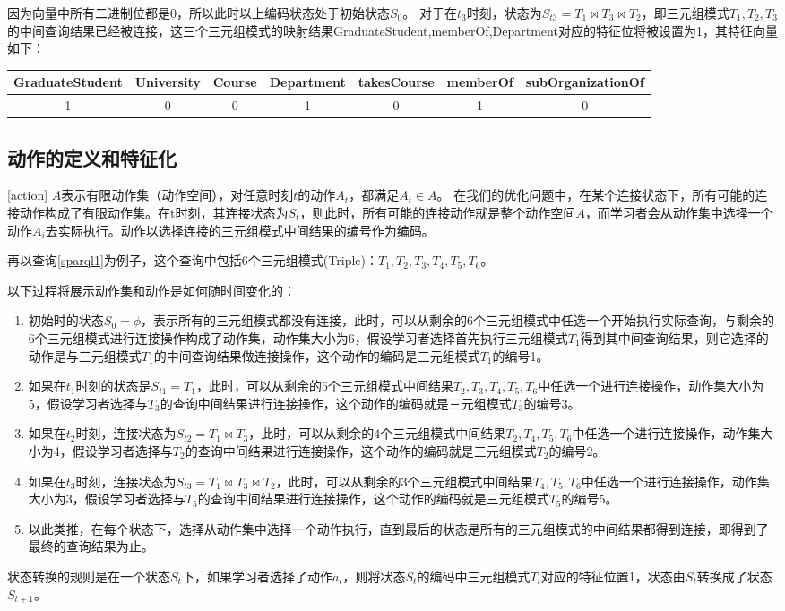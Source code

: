 因为向量中所有二进制位都是0，所以此时以上编码状态处于初始状态$S_0$。
对于在$t_3$时刻，状态为$S_{t3} = T_1 \Join T_3 \Join T_2$，即三元组模式$T_1,T_2,T_3$的中间查询结果已经被连接，这三个三元组模式的映射结果GraduateStudent,memberOf,Department对应的特征位将被设置为1，其特征向量如下：
\begin{table}[htbp]    
    \vspace{0.5em}\centering\wuhao
    \begin{tabular}{ccccccc}
    \toprule[1.5pt]
    GraduateStudent& University&Course&Department&takesCourse&memberOf&subOrganizationOf\\
    \midrule[1pt]    
    1&0&0&1&0&1&0\\
    \bottomrule[1.5pt]
    \end{tabular}
\end{table}

\subsection{动作的定义和特征化}[action]
$A$表示有限动作集（动作空间），对任意时刻$t$的动作$A_t$，都满足$A_t \in A$。
在我们的优化问题中，在某个连接状态下，所有可能的连接动作构成了有限动作集。在t时刻，其连接状态为$S_t$，则此时，所有可能的连接动作就是整个动作空间$A$，而学习者会从动作集中选择一个动作$A_i$去实际执行。动作以选择连接的三元组模式中间结果的编号作为编码。

再以查询\ref{sparql1}为例子，这个查询中包括6个三元组模式(Triple)：$T_1, T_2, T_3, T_4, T_5, T_6$。

以下过程将展示动作集和动作是如何随时间变化的：
\begin{enumerate}
    \item 初始时的状态$S_0=\phi$，表示所有的三元组模式都没有连接，此时，可以从剩余的6个三元组模式中任选一个开始执行实际查询，与剩余的6个三元组模式进行连接操作构成了动作集，动作集大小为6，假设学习者选择首先执行三元组模式$T_1$得到其中间查询结果，则它选择的动作是与三元组模式$T_1$的中间查询结果做连接操作，这个动作的编码是三元组模式$T_1$的编号1。
    \item 如果在$t_1$时刻的状态是$S_{t1} = T_1$，此时，可以从剩余的5个三元组模式中间结果$T_2,T_3,T_4,T_5,T_6$中任选一个进行连接操作，动作集大小为5，假设学习者选择与$T_3$的查询中间结果进行连接操作，这个动作的编码就是三元组模式$T_3$的编号3。
    \item 如果在$t_2$时刻，连接状态为$S_{t2} = T_1 \Join T_3$，此时，可以从剩余的4个三元组模式中间结果$T_2,T_4,T_5,T_6$中任选一个进行连接操作，动作集大小为4，假设学习者选择与$T_2$的查询中间结果进行连接操作，这个动作的编码就是三元组模式$T_2$的编号2。
    \item 如果在$t_3$时刻，连接状态为$S_{t3} = T_1 \Join T_3 \Join T_2$，此时，可以从剩余的3个三元组模式中间结果$T_4,T_5,T_6$中任选一个进行连接操作，动作集大小为3，假设学习者选择与$T_5$的查询中间结果进行连接操作，这个动作的编码就是三元组模式$T_5$的编号5。
    \item 以此类推，在每个状态下，选择从动作集中选择一个动作执行，直到最后的状态是所有的三元组模式的中间结果都得到连接，即得到了最终的查询结果为止。
\end{enumerate}
状态转换的规则是在一个状态$S_t$下，如果学习者选择了动作$a_i$，则将状态$S_t$的编码中三元组模式$T_i$对应的特征位置1，状态由$S_t$转换成了状态$S_{t+1}$。

